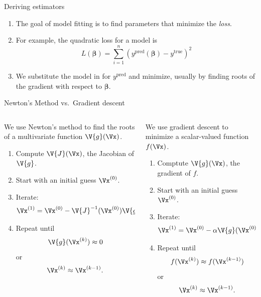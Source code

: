 \documentclass[9pt]{beamer}
\begin{document}
\begin{frame}{Deriving estimators}
\begin{enumerate}
	\item The goal of model fitting is to find parameters that minimize the \emph{loss}.
	\item For example, the quadratic loss for a model is
	\[ L(\boldsymbol{\beta}) = \sum_{i=1}^n\left( y^\text{pred}(\boldsymbol{\beta}) - y^\text{true} \right)^2 \]
	\pause
	\item We substitute the model in for $y^\text{pred}$ and minimize, usually by finding roots of the gradient with respect to $\boldsymbol{\beta}$. 
\end{enumerate}
\end{frame}

\begin{frame}{Newton's Method vs.\ Gradient descent}

\begin{columns}
\begin{column}{0.5\textwidth}
	We use Newton's method to find the roots of a multivariate function $\V{g}(\Vx)$.
	
	\begin{enumerate}
		\item Compute $\V{J}(\Vx)$, the Jacobian of $\V{g}$.
		\item Start with an initial guess $\Vx^{(0)}$.
		\item Iterate: \[ \Vx^{(1)} = \Vx^{(0)} - \V{J}^{-1}(\Vx^{(0)})\V{g}(\Vx^{(0)}). \]
		\item Repeat until \[ \V{g}(\Vx^{(k)}) \approx 0 \] or \[ \Vx^{(k)} \approx \Vx^{(k-1)}. \]
	\end{enumerate}
\end{column}
\begin{column}{0.5\textwidth}
	We use gradient descent to minimize a scalar-valued function $f(\Vx)$.
	
	\begin{enumerate}
		\item Comptute $\V{g}(\Vx)$, the gradient of $f$.
		\item Start with an initial guess $\Vx^{(0)}$.
		\item Iterate: \[ \Vx^{(1)} = \Vx^{(0)} - \alpha \V{g}(\Vx^{(0)}). \]
		\item Repeat until \[ f(\Vx^{(k)}) \approx f(\Vx^{(k-1)}) \] or \[ \Vx^{(k)} \approx \Vx^{(k-1)}. \]
	\end{enumerate}
\end{column}
\end{columns}

	
\end{frame}
\end{document}
